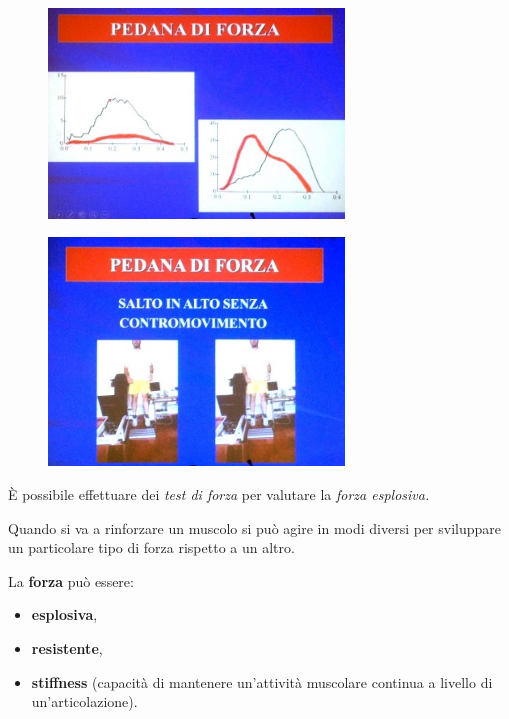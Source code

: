 \begin{figure}[!ht]
\centering
	\includegraphics[width=0.7\textwidth]{030/image12.jpeg}
\end{figure}
\begin{figure}[!ht]
\centering
	\includegraphics[width=0.7\textwidth]{030/image13.jpeg}
\end{figure}

È possibile effettuare dei \emph{test di forza} per valutare la
\emph{forza esplosiva. }

Quando si va a rinforzare un muscolo si può agire in modi diversi per
sviluppare un particolare tipo di forza rispetto a un altro.

La \textbf{forza} può essere:

\begin{itemize}
 
\item
  \textbf{esplosiva},
\item 
  \textbf{resistente},
\item 
  \textbf{stiffness} (capacità di mantenere un'attività muscolare
  continua a livello di un'articolazione).
\end{itemize}

